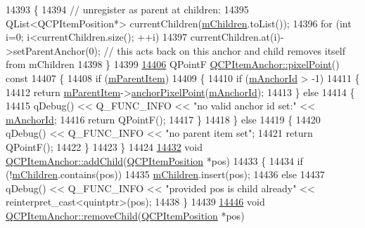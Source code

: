 \begin{DoxyCode}
14393 \{
14394   \textcolor{comment}{// unregister as parent at children:}
14395   QList<QCPItemPosition*> currentChildren(\hyperlink{a00032_a5f0e67f395a63e2dd0e29ff1dcaf37b7}{mChildren}.toList());
14396   \textcolor{keywordflow}{for} (\textcolor{keywordtype}{int} i=0; i<currentChildren.size(); ++i)
14397     currentChildren.at(i)->setParentAnchor(0); \textcolor{comment}{// this acts back on this anchor and child removes itself
       from mChildren}
14398 \}
14399 
\hypertarget{a00115_source_l14406}{}\hyperlink{a00032_ae92def8f9297c5d73f5806c586517bb3}{14406} QPointF \hyperlink{a00032_ae92def8f9297c5d73f5806c586517bb3}{QCPItemAnchor::pixelPoint}()\textcolor{keyword}{ const}
14407 \textcolor{keyword}{}\{
14408   \textcolor{keywordflow}{if} (\hyperlink{a00032_a80fad480ad3bb980446ed6ebc00818ae}{mParentItem})
14409   \{
14410     \textcolor{keywordflow}{if} (\hyperlink{a00032_a00c62070333e8345976b579676ad3997}{mAnchorId} > -1)
14411     \{
14412       \textcolor{keywordflow}{return} \hyperlink{a00032_a80fad480ad3bb980446ed6ebc00818ae}{mParentItem}->\hyperlink{a00022_a94bde62b8a2fc133666dcbb8035deeed}{anchorPixelPoint}(\hyperlink{a00032_a00c62070333e8345976b579676ad3997}{mAnchorId});
14413     \} \textcolor{keywordflow}{else}
14414     \{
14415       qDebug() << Q\_FUNC\_INFO << \textcolor{stringliteral}{"no valid anchor id set:"} << \hyperlink{a00032_a00c62070333e8345976b579676ad3997}{mAnchorId};
14416       \textcolor{keywordflow}{return} QPointF();
14417     \}
14418   \} \textcolor{keywordflow}{else}
14419   \{
14420     qDebug() << Q\_FUNC\_INFO << \textcolor{stringliteral}{"no parent item set"};
14421     \textcolor{keywordflow}{return} QPointF();
14422   \}
14423 \}
14424 
\hypertarget{a00115_source_l14432}{}\hyperlink{a00032_ad11517e2ce5c2f9a798e78fb45e2e0d0}{14432} \textcolor{keywordtype}{void} \hyperlink{a00032_ad11517e2ce5c2f9a798e78fb45e2e0d0}{QCPItemAnchor::addChild}(\hyperlink{a00038}{QCPItemPosition} *pos)
14433 \{
14434   \textcolor{keywordflow}{if} (!\hyperlink{a00032_a5f0e67f395a63e2dd0e29ff1dcaf37b7}{mChildren}.contains(pos))
14435     \hyperlink{a00032_a5f0e67f395a63e2dd0e29ff1dcaf37b7}{mChildren}.insert(pos);
14436   \textcolor{keywordflow}{else}
14437     qDebug() << Q\_FUNC\_INFO << \textcolor{stringliteral}{"provided pos is child already"} << \textcolor{keyword}{reinterpret\_cast<}quintptr\textcolor{keyword}{>}(pos);
14438 \}
14439 
\hypertarget{a00115_source_l14446}{}\hyperlink{a00032_ab65ec61984575f737f43c2bb59dd0d76}{14446} \textcolor{keywordtype}{void} \hyperlink{a00032_ab65ec61984575f737f43c2bb59dd0d76}{QCPItemAnchor::removeChild}(\hyperlink{a00038}{QCPItemPosition} *pos)

\end{DoxyCode}

